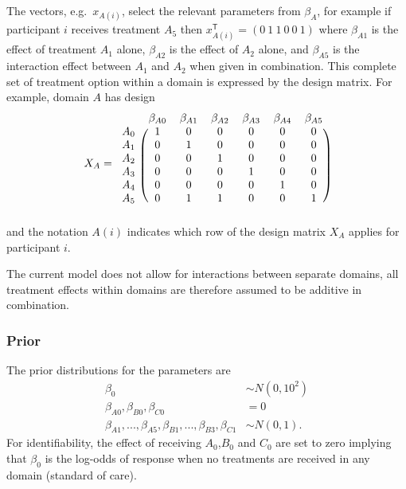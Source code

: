\documentclass[
]{article}
\begin{document}
The vectors, e.g.~\(x_{A(i)}\), select the relevant parameters from \(\beta_A\), for example if participant \(i\) receives treatment \(A_5\) then \(x_{A(i)}^{\mathsf{T}} = (0\ 1\ 1\ 0\ 0\ 1)\) where \(\beta_{A1}\) is the effect of treatment \(A_1\) alone, \(\beta_{A2}\) is the effect of \(A_2\) alone, and \(\beta_{A5}\) is the interaction effect between \(A_1\) and \(A_2\) when given in combination.
This complete set of treatment option within a domain is expressed by the design matrix.
For example, domain \(A\) has design
\[
 X_{A} = 
\begin{blockarray}{ccccccc}
          & \beta_{A0} & \beta_{A1} & \beta_{A2} & \beta_{A3} & \beta_{A4} & \beta_{A5} \\
\begin{block}{r(cccccc)}
      A_0 & 1 & 0 & 0 & 0 & 0 & 0 \\
      A_1 & 0 & 1 & 0 & 0 & 0 & 0 \\
      A_2 & 0 & 0 & 1 & 0 & 0 & 0 \\
      A_3 & 0 & 0 & 0 & 1 & 0 & 0 \\
      A_4 & 0 & 0 & 0 & 0 & 1 & 0 \\
      A_5 & 0 & 1 & 1 & 0 & 0 & 1 \\
\end{block}
\end{blockarray}
\]
and the notation \(A(i)\) indicates which row of the design matrix \(X_A\) applies for participant \(i\).

The current model does not allow for interactions between separate domains, all treatment effects within domains are therefore assumed to be additive in combination.

\hypertarget{prior}{%
\subsubsection{Prior}\label{prior}}

The prior distributions for the parameters are
\[
\begin{aligned}
\beta_0 &\sim N(0, 10^2) \\
\beta_{A0},\beta_{B0},\beta_{C0} &= 0 \\
\beta_{A1},...,\beta_{A5},\beta_{B1},...,\beta_{B3},\beta_{C1} &\sim N(0, 1).
\end{aligned}
\]
For identifiability, the effect of receiving \(A_0\),\(B_0\) and \(C_0\) are set to zero implying that \(\beta_0\) is the log-odds of response when no treatments are received in any domain (standard of care).
\end{document}
